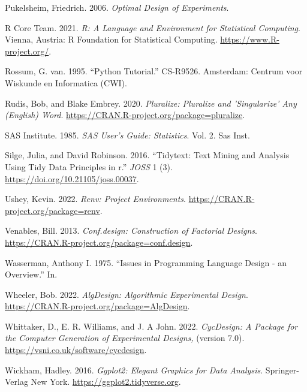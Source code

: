 \documentclass{article}
\newlength{\cslhangindent}
\newlength{\cslentryspacingunit} %
\newenvironment{CSLReferences}[2] %
 {%
  \setlength{\parindent}{0pt}
  \ifodd #1
  \let\oldpar\par
  \def\par{\hangindent=\cslhangindent\oldpar}
  \fi
  \setlength{\parskip}{#2\cslentryspacingunit}
 }%
 {}
\begin{document}
\begin{CSLReferences}{1}{0}
\leavevmode{}%
Pukelsheim, Friedrich. 2006. \emph{Optimal Design of Experiments}.

\leavevmode{}%
R Core Team. 2021. \emph{R: A Language and Environment for Statistical
Computing}. Vienna, Austria: R Foundation for Statistical Computing.
\url{https://www.R-project.org/}.

\leavevmode{}%
Rossum, G. van. 1995. {``Python Tutorial.''} CS-R9526. Amsterdam:
Centrum voor Wiskunde en Informatica (CWI).

\leavevmode{}%
Rudis, Bob, and Blake Embrey. 2020. \emph{Pluralize: Pluralize and
'Singularize' Any (English) Word}.
\url{https://CRAN.R-project.org/package=pluralize}.

\leavevmode{}%
SAS Institute. 1985. \emph{SAS User's Guide: Statistics}. Vol. 2. Sas
Inst.

\leavevmode{}%
Silge, Julia, and David Robinson. 2016. {``Tidytext: Text Mining and
Analysis Using Tidy Data Principles in r.''} \emph{JOSS} 1 (3).
\url{https://doi.org/10.21105/joss.00037}.

\leavevmode{}%
Ushey, Kevin. 2022. \emph{Renv: Project Environments}.
\url{https://CRAN.R-project.org/package=renv}.

\leavevmode{}%
Venables, Bill. 2013. \emph{Conf.design: Construction of Factorial
Designs}. \url{https://CRAN.R-project.org/package=conf.design}.

\leavevmode{}%
Wasserman, Anthony I. 1975. {``Issues in Programming Language Design -
an Overview.''} In.

\leavevmode{}%
Wheeler, Bob. 2022. \emph{AlgDesign: Algorithmic Experimental Design}.
\url{https://CRAN.R-project.org/package=AlgDesign}.

\leavevmode{}%
Whittaker, D., E. R. Williams, and J. A John. 2022. \emph{CycDesign: A
Package for the Computer Generation of Experimental Designs,} (version
7.0). \url{https://vsni.co.uk/software/cycdesign}.

\leavevmode{}%
Wickham, Hadley. 2016. \emph{Ggplot2: Elegant Graphics for Data
Analysis}. Springer-Verlag New York.
\url{https://ggplot2.tidyverse.org}.


\end{CSLReferences}
\end{document}

